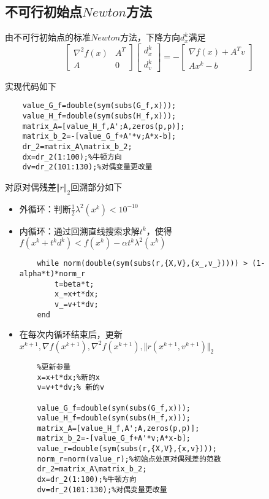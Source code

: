 \documentclass{article}
\begin{document}
\subsection{不可行初始点$Newton$方法}
由不可行初始点的标准$Newton$方法，下降方向$d^k_x$满足
\begin{equation*}
    \left[\begin{array}{cc}
            \nabla^2 f(x) & A^T \\
            A             & 0
        \end{array}\right]
    \left[\begin{array}{c}
            d^k_x \\
            d^k_v
        \end{array}\right]
    =
    -\left[\begin{array}{c}
            \nabla f(x)+A^Tv \\
            Ax^k-b
        \end{array}\right]
\end{equation*}

实现代码如下
\begin{lstlisting}
    value_G_f=double(sym(subs(G_f,x)));
    value_H_f=double(sym(subs(H_f,x)));
    matrix_A=[value_H_f,A';A,zeros(p,p)];
    matrix_b_2=-[value_G_f+A'*v;A*x-b];
    dr_2=matrix_A\matrix_b_2;
    dx=dr_2(1:100);%牛顿方向
    dv=dr_2(101:130);%对偶变量更改量
\end{lstlisting}

对原对偶残差$\Vert r \Vert_2$回溯部分如下
\begin{itemize}
    \item 外循环：判断$\frac{1}{2}\lambda^2(x^k)<10^{-10}$
    \item 内循环：通过回溯直线搜索求解$t^k$，使得$f(x^k+t^kd^k)<f(x^k)-\alpha t^k \lambda^2(x^k)$
          \begin{lstlisting}
    while norm(double(sym(subs(r,{X,V},{x_,v_})))) > (1-alpha*t)*norm_r
        t=beta*t;
        x_=x+t*dx;
        v_=v+t*dv;
    end
    \end{lstlisting}
    \item 在每次内循环结束后，更新$x^{k+1},\nabla f(x^{k+1}) ,\nabla^2 f(x^{k+1}),\Vert r(x^{k+1},v^{k+1}) \Vert_2$
          \begin{lstlisting}
    %更新参量
    x=x+t*dx;%新的x
    v=v+t*dv;% 新的v

    value_G_f=double(sym(subs(G_f,x)));
    value_H_f=double(sym(subs(H_f,x)));
    matrix_A=[value_H_f,A';A,zeros(p,p)];
    matrix_b_2=-[value_G_f+A'*v;A*x-b];
    value_r=double(sym(subs(r,{X,V},{x,v})));
    norm_r=norm(value_r);%初始点处原对偶残差的范数
    dr_2=matrix_A\matrix_b_2;
    dx=dr_2(1:100);%牛顿方向
    dv=dr_2(101:130);%对偶变量更改量
    \end{lstlisting}
\end{itemize}
\end{document}
